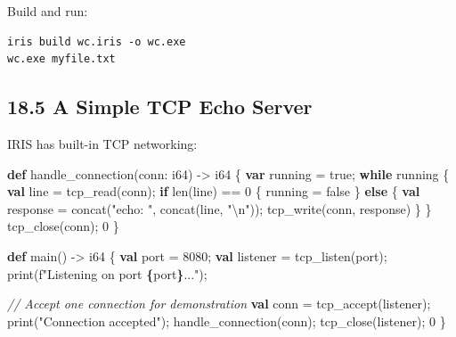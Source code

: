 \documentclass[
  english,
]{book}
\newenvironment{Shaded}{\begin{snugshade}}{\end{snugshade}}
\newcommand{\CommentTok}[1]{\textcolor[rgb]{0.42,0.60,0.33}{\textit{#1}}}
\newcommand{\ConstantTok}[1]{\textcolor[rgb]{0.31,0.76,1.00}{#1}}
\newcommand{\ControlFlowTok}[1]{\textcolor[rgb]{0.77,0.53,0.75}{\textbf{#1}}}
\newcommand{\DataTypeTok}[1]{\textcolor[rgb]{0.31,0.79,0.69}{#1}}
\newcommand{\DecValTok}[1]{\textcolor[rgb]{0.71,0.81,0.66}{#1}}
\newcommand{\FunctionTok}[1]{\textcolor[rgb]{0.86,0.86,0.67}{#1}}
\newcommand{\KeywordTok}[1]{\textcolor[rgb]{0.34,0.61,0.84}{\textbf{#1}}}
\newcommand{\NormalTok}[1]{\textcolor[rgb]{0.83,0.83,0.83}{#1}}
\newcommand{\OperatorTok}[1]{\textcolor[rgb]{0.83,0.83,0.83}{#1}}
\newcommand{\StringTok}[1]{\textcolor[rgb]{0.81,0.57,0.47}{#1}}
\begin{document}
Build and run:

\begin{verbatim}
iris build wc.iris -o wc.exe
wc.exe myfile.txt
\end{verbatim}

\subsection{18.5 A Simple TCP Echo
Server}\label{a-simple-tcp-echo-server}

IRIS has built-in TCP networking:

\begin{Shaded}
\begin{Highlighting}[]
\KeywordTok{def}\NormalTok{ handle\_connection(conn: }\DataTypeTok{i64}\NormalTok{) }\OperatorTok{{-}\textgreater{}} \DataTypeTok{i64}\NormalTok{ \{}
    \KeywordTok{var}\NormalTok{ running }\OperatorTok{=} \ConstantTok{true}\NormalTok{;}
    \ControlFlowTok{while}\NormalTok{ running \{}
        \KeywordTok{val}\NormalTok{ line }\OperatorTok{=} \FunctionTok{tcp\_read}\NormalTok{(conn);}
        \ControlFlowTok{if} \FunctionTok{len}\NormalTok{(line) }\OperatorTok{==} \DecValTok{0}\NormalTok{ \{}
\NormalTok{            running }\OperatorTok{=} \ConstantTok{false}
\NormalTok{        \} }\ControlFlowTok{else}\NormalTok{ \{}
            \KeywordTok{val}\NormalTok{ response }\OperatorTok{=} \FunctionTok{concat}\NormalTok{(}\StringTok{"echo: "}\NormalTok{, }\FunctionTok{concat}\NormalTok{(line, }\StringTok{"\textbackslash{}n"}\NormalTok{));}
            \FunctionTok{tcp\_write}\NormalTok{(conn, response)}
\NormalTok{        \}}
\NormalTok{    \}}
    \FunctionTok{tcp\_close}\NormalTok{(conn);}
    \DecValTok{0}
\NormalTok{\}}

\KeywordTok{def}\NormalTok{ main() }\OperatorTok{{-}\textgreater{}} \DataTypeTok{i64}\NormalTok{ \{}
    \KeywordTok{val}\NormalTok{ port }\OperatorTok{=} \DecValTok{8080}\NormalTok{;}
    \KeywordTok{val}\NormalTok{ listener }\OperatorTok{=} \FunctionTok{tcp\_listen}\NormalTok{(port);}
    \FunctionTok{print}\NormalTok{(}\StringTok{f"Listening on port }\ControlFlowTok{\{}\NormalTok{port}\ControlFlowTok{\}}\StringTok{..."}\NormalTok{);}

    \CommentTok{// Accept one connection for demonstration}
    \KeywordTok{val}\NormalTok{ conn }\OperatorTok{=} \FunctionTok{tcp\_accept}\NormalTok{(listener);}
    \FunctionTok{print}\NormalTok{(}\StringTok{"Connection accepted"}\NormalTok{);}
\NormalTok{    handle\_connection(conn);}
    \FunctionTok{tcp\_close}\NormalTok{(listener);}
    \DecValTok{0}
\NormalTok{\}}
\end{Highlighting}
\end{Shaded}
\end{document}
